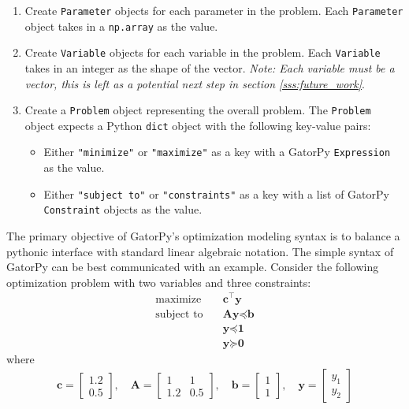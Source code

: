 \documentclass[conference]{IEEEtran}
\begin{document}
\begin{enumerate}
    \item Create \texttt{Parameter} objects for each parameter in the problem.
    Each \texttt{Parameter} object takes in a \texttt{np.array} as the value.
    \item Create \texttt{Variable} objects for each variable in the problem.
    Each \texttt{Variable} takes in an integer as the shape of the vector.
    \textit{Note: Each variable must be a vector, this is left as a potential next step in section \ref{sss:future_work}}.
    \item Create a \texttt{Problem} object representing the overall problem.
    The \texttt{Problem} object expects a Python \texttt{dict} object with the following key-value pairs:
    \begin{itemize}
        \item Either \texttt{"minimize"} or \texttt{"maximize"} as a key with a GatorPy \texttt{Expression} as the value.
        \item Either \texttt{"subject to"} or \texttt{"constraints"} as a key with a list of GatorPy \texttt{Constraint} objects as the value.
    \end{itemize}
\end{enumerate}
The primary objective of GatorPy's optimization modeling syntax is to balance a pythonic interface with standard linear algebraic notation.
The simple syntax of GatorPy can be best communicated with an example.
Consider the following optimization problem with two variables and three constraints:
\begin{align*}
  \text{maximize} & \quad \textbf{c}^\top \textbf{y} \\
  \text{subject to} & \quad \textbf{A} \textbf{y} \preceq \textbf{b} \\
  & \quad \textbf{y} \preceq \textbf{1} \\
  & \quad \textbf{y} \succeq \textbf{0}
\end{align*}
where
\begin{align*}
    \textbf{c} = \begin{bmatrix} 1.2 \\ 0.5 \end{bmatrix}, \quad
    \textbf{A} = \begin{bmatrix} 1 & 1 \\ 1.2 & 0.5 \end{bmatrix}, \quad
    \textbf{b} = \begin{bmatrix} 1 \\ 1 \end{bmatrix}, \quad
    \textbf{y} = \begin{bmatrix} y_1 \\ y_2  \end{bmatrix}
\end{align*}
\end{document}
